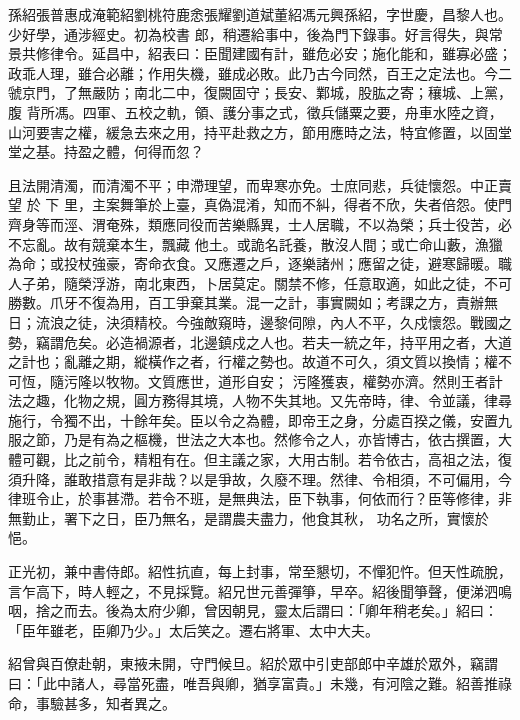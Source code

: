 
\begin{pinyinscope}

 孫紹張普惠成淹範紹劉桃符鹿悆張耀劉道斌董紹馮元興孫紹，字世慶，昌黎人也。少好學，通涉經史。初為校書
 郎，稍遷給事中，後為門下錄事。好言得失，與常景共修律令。延昌中，紹表曰：臣聞建國有計，雖危必安；施化能和，雖寡必盛；政乖人理，雖合必離；作用失機，雖成必敗。此乃古今同然，百王之定法也。今二虢京門，了無嚴防；南北二中，復闕固守；長安、鄴城，股肱之寄；穰城、上黨，腹
 背所馮。四軍、五校之軌，領、護分事之式，徵兵儲粟之要，舟車水陸之資，山河要害之權，緩急去來之用，持平赴救之方，節用應時之法，特宜修置，以固堂堂之基。持盈之體，何得而忽？



 且法開清濁，而清濁不平；申滯理望，而卑寒亦免。士庶同悲，兵徒懷怨。中正賣望
 於
 下
 里，主案舞筆於上臺，真偽混淆，知而不糾，得者不欣，失者倍怨。使門齊身等而涇、渭奄殊，類應同役而苦樂縣異，士人居職，不以為榮；兵士役苦，必不忘亂。故有競棄本生，飄藏
 他土。或詭名託養，散沒人間；或亡命山藪，漁獵為命；或投杖強豪，寄命衣食。又應遷之戶，逐樂諸州；應留之徒，避寒歸暖。職人子弟，隨榮浮游，南北東西，卜居莫定。關禁不修，任意取適，如此之徒，不可勝數。爪牙不復為用，百工爭棄其業。混一之計，事實闕如；考課之方，責辦無日；流浪之徒，決須精校。今強敵窺時，邊黎伺隙，內人不平，久戍懷怨。戰國之勢，竊謂危矣。必造禍源者，北邊鎮戍之人也。若夫一統之年，持平用之者，大道之計也；亂離之期，縱橫作之者，行權之勢也。故道不可久，須文質以換情；權不可恆，隨污隆以牧物。文質應世，道形自安；
 污隆獲衷，權勢亦濟。然則王者計法之趣，化物之規，圓方務得其境，人物不失其地。又先帝時，律、令並議，律尋施行，令獨不出，十餘年矣。臣以令之為體，即帝王之身，分處百揆之儀，安置九服之節，乃是有為之樞機，世法之大本也。然修令之人，亦皆博古，依古撰置，大體可觀，比之前令，精粗有在。但主議之家，大用古制。若令依古，高祖之法，復須升降，誰敢措意有是非哉？以是爭故，久廢不理。然律、令相須，不可偏用，今律班令止，於事甚滯。若令不班，是無典法，臣下執事，何依而行？臣等修律，非無勤止，署下之日，臣乃無名，是謂農夫盡力，他食其秋，
 功名之所，實懷於悒。



 正光初，兼中書侍郎。紹性抗直，每上封事，常至懇切，不憚犯忤。但天性疏脫，言乍高下，時人輕之，不見採覽。紹兄世元善彈箏，早卒。紹後聞箏聲，便涕泗鳴咽，捨之而去。後為太府少卿，曾因朝見，靈太后謂曰：「卿年稍老矣。」紹曰：「臣年雖老，臣卿乃少。」太后笑之。遷右將軍、太中大夫。



 紹曾與百僚赴朝，東掖未開，守門候旦。紹於眾中引吏部郎中辛雄於眾外，竊謂曰：「此中諸人，尋當死盡，唯吾與卿，猶享富貴。」未幾，有河陰之難。紹善推祿命，事驗甚多，知者異之。




\end{pinyinscope}
